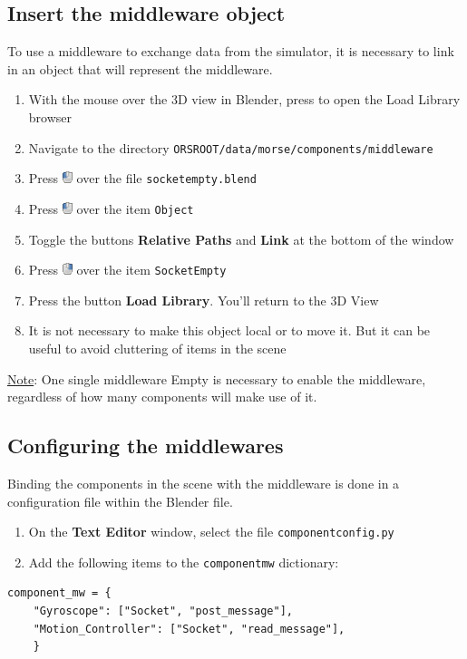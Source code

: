 \documentclass[twoside,a4paper,10pt]{report}
\newcommand{\key}[1]{\fcolorbox{Dark}{Light}{\textbf{#1}}}
\newcommand{\dokutitleleveltree}[1]{\subsection{#1}}
\newcommand{\dokubold}[1]{\textbf{#1}}
\newcommand{\dokumonospace}[1]{\texttt{#1}}
\newcommand{\dokuunderline}[1]{\underline{#1}}
\newcommand{\dokuitem}{\item}
\begin{document}
\dokutitleleveltree{Insert the middleware object}
\label{fc2213e90f6f9853c66c14f9f79c3379}%
To use a middleware to exchange data from the simulator, it is necessary to link in an object that will represent the middleware.



\begin{enumerate}\dokuitem  With the mouse over the 3D view in Blender, press \key{Shift + F1} to open the Load Library browser
\dokuitem  Navigate to the directory \dokumonospace{{\textdollar}ORS{\textunderscore}ROOT/data/morse/components/middleware}
\dokuitem  Press \includegraphics[height=1em]{LMB.png} over the file \dokumonospace{socket{\textunderscore}empty.blend}
\dokuitem  Press \includegraphics[height=1em]{LMB.png} over the item \dokumonospace{Object}
\dokuitem  Toggle the buttons \dokubold{Relative Paths} and \dokubold{Link} at the bottom of the window
\dokuitem  Press \includegraphics[height=1em]{RMB.png} over the item \dokumonospace{Socket{\textunderscore}Empty}
\dokuitem  Press the button \dokubold{Load Library}. You'll return to the 3D View
\dokuitem  It is not necessary to make this object local or to move it. But it can be useful to avoid cluttering of items in the scene
\end{enumerate}

\dokuunderline{Note}: One single middleware Empty is necessary to enable the middleware, regardless of how many components will make use of it.


\dokutitleleveltree{Configuring the middlewares}
\label{7c1b9786b6402b908e3042548cd3c1c6}%
Binding the components in the scene with the middleware is done in a configuration file within the Blender file.



\begin{enumerate}\dokuitem  On the \dokubold{Text Editor} window, select the file \dokumonospace{component{\textunderscore}config.py}
\dokuitem  Add the following items to the \dokumonospace{component{\textunderscore}mw} dictionary:
\end{enumerate}

\lstset{language=python}
\begin{lstlisting}
component_mw = {
    "Gyroscope": ["Socket", "post_message"],
    "Motion_Controller": ["Socket", "read_message"],
	}

\end{lstlisting}
\end{document}
